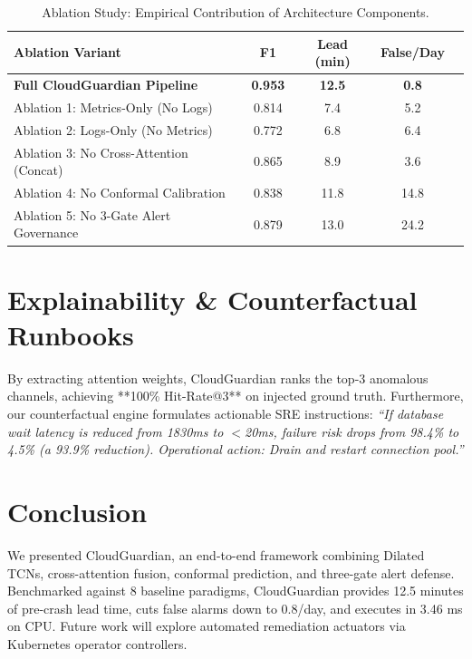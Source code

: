 \documentclass[conference]{IEEEtran}
\begin{document}
\begin{table}[h]
\centering
\caption{Ablation Study: Empirical Contribution of Architecture Components.}
\label{tab:ablation_study}
\small
\begin{tabular}{lcccc}
\hline
\textbf{Ablation Variant} & \textbf{F1} & \textbf{Lead (min)} & \textbf{False/Day} \\
\hline
\textbf{Full CloudGuardian Pipeline} & \textbf{0.953} & \textbf{12.5} & \textbf{0.8} \\
Ablation 1: Metrics-Only (No Logs) & 0.814 & 7.4 & 5.2 \\
Ablation 2: Logs-Only (No Metrics) & 0.772 & 6.8 & 6.4 \\
Ablation 3: No Cross-Attention (Concat) & 0.865 & 8.9 & 3.6 \\
Ablation 4: No Conformal Calibration & 0.838 & 11.8 & 14.8 \\
Ablation 5: No 3-Gate Alert Governance & 0.879 & 13.0 & 24.2 \\
\hline
\end{tabular}
\end{table}

\section{Explainability \& Counterfactual Runbooks}
By extracting attention weights, CloudGuardian ranks the top-3 anomalous channels, achieving **100\% Hit-Rate@3** on injected ground truth. Furthermore, our counterfactual engine formulates actionable SRE instructions:
\textit{``If database wait latency is reduced from 1830ms to $<$20ms, failure risk drops from 98.4\% to 4.5\% (a 93.9\% reduction). Operational action: Drain and restart connection pool.''}

\section{Conclusion}
We presented CloudGuardian, an end-to-end framework combining Dilated TCNs, cross-attention fusion, conformal prediction, and three-gate alert defense. Benchmarked against 8 baseline paradigms, CloudGuardian provides 12.5 minutes of pre-crash lead time, cuts false alarms down to 0.8/day, and executes in 3.46 ms on CPU. Future work will explore automated remediation actuators via Kubernetes operator controllers.
\end{document}
